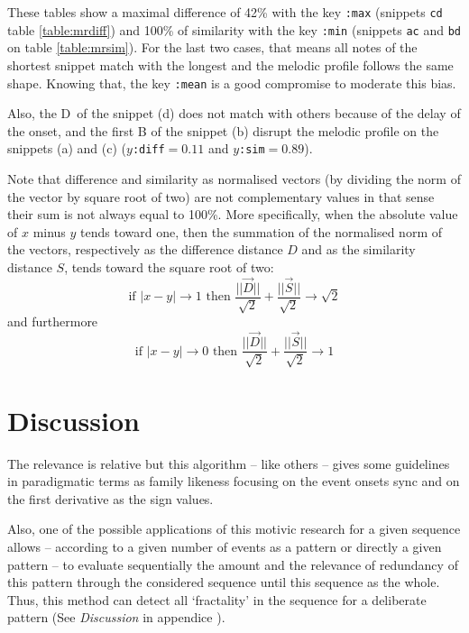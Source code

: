 These tables show a maximal difference of 42\% with the key \texttt{:max} (snippets \texttt{cd} table \ref{table:mrdiff}) and 100\% of similarity with the key \texttt{:min} (snippets \texttt{ac} and \texttt{bd} on table \ref{table:mrsim}).
For the last two cases, that means all notes of the shortest snippet match with the longest and the melodic profile follows the same shape. Knowing that, the key \texttt{:mean} is a good compromise to moderate this bias. 

Also, the \textsf{D}\sh \  of the snippet (d) does not match with others because of the delay of the onset, and the first \textsf{B} of the snippet (b) disrupt the melodic profile on the snippets (a) and (c) ($y$\texttt{:diff}$=0.11$ and $y$\texttt{:sim}$=0.89$).

Note that difference and similarity as normalised vectors (by dividing the norm of the vector by square root of two) are not complementary values in that sense their sum is not always equal to 100\%. More specifically, when the absolute value of $x$ minus $y$ tends toward one, then the summation of the normalised norm of the vectors, respectively as the difference distance $D$ and as the similarity distance $S$, tends toward the square root of two:
$$\text{if } |x-y| \to 1 \text{ then } \frac{||\overrightarrow{D}||}{\sqrt{2}} + \frac{||\overrightarrow{S}||}{\sqrt{2}} \to \sqrt{2}$$
 and furthermore
 $$\text{if } |x-y| \to 0 \text{ then } \frac{||\overrightarrow{D}||}{\sqrt{2}} + \frac{||\overrightarrow{S}||}{\sqrt{2}} \to 1$$
 
 \section{Discussion}

The relevance is relative but this algorithm -- like others -- gives some guidelines in paradigmatic terms as family likeness focusing on the event onsets sync  and on the first derivative  as the sign values. 

\bigskip

Also, one of the possible applications of this motivic research for a given sequence allows -- according to a given number of events as a pattern or directly a given pattern -- to evaluate sequentially the amount and the relevance of redundancy of this pattern through the considered sequence until this sequence as the whole. Thus, this method can detect all `fractality' in the sequence for a deliberate pattern (See \textsl{Discussion} in appendice ).
